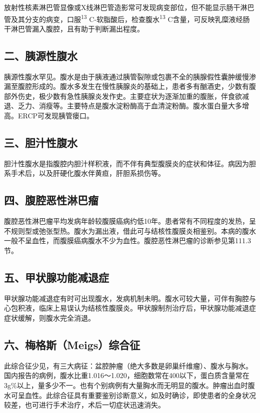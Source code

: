 放射性核素淋巴管显像或X线淋巴管造影常可发现病变部位，但不能显示肠干淋巴管及其分支的病变，口服\textsuperscript{13}
C-软脂酸后，检查腹水\textsuperscript{13}
C含量，可反映乳糜液经肠干淋巴管漏入腹腔，且有助于判断漏出程度。

\subsection{二、胰源性腹水}

胰源性腹水罕见。腹水是由于胰液通过胰管裂隙或包裹不全的胰腺假性囊肿缓慢渗漏至腹腔形成的。腹水多发生在慢性胰腺炎的基础上，患者多有酗酒史，少数有腹部外伤史，极少数有急性胰腺炎发作史。主要症状为逐渐加重的腹胀，伴食欲减退、乏力、消瘦等。主要特点是腹水淀粉酶高于血清淀粉酶。腹水蛋白量大多增高。ERCP可发现胰管瘘口。

\subsection{三、胆汁性腹水}

胆汁性腹水是指腹腔内胆汁样积液，而不伴有典型腹膜炎的症状和体征。病因为胆系手术后，以及肝硬化腹水伴黄疸，肝胆系损伤等。

\subsection{四、腹腔恶性淋巴瘤}

腹腔恶性淋巴瘤平均发病年龄较腹膜癌病约低10年。患者常有不同程度的发热，呈不规则型或弛张型热。腹水为漏出液，借此可与结核性腹膜炎相鉴别。本病的腹水一般不呈血性，而腹膜癌病腹水不少为血性。腹腔恶性淋巴瘤的诊断参见第111.3节。

\subsection{五、甲状腺功能减退症}

甲状腺功能减退症有时可出现腹水，发病机制未明。腹水可较大量，可伴有胸腔与心包积液，临床上易误认为结核性腹膜炎。甲状腺制剂治疗后，甲状腺功能减退症症状缓解，则腹水完全消退。

\subsection{六、梅格斯（Meigs）综合征}

此综合征少见，有三大病征：盆腔肿瘤（绝大多数是卵巢纤维瘤）、腹水与胸水。国内报告的病例，腹水比重1.016～1.020，细胞数常在400以下，蛋白质含量常在3g\%以上，量多少不一。也有个别病例有大量胸水而无明显的腹水。肿瘤出血时腹水可呈血性。此综合征具有重要鉴别诊断意义，如及时确诊，即使患者的全身状况较差，也可进行手术治疗，术后一切症状迅速消失。

